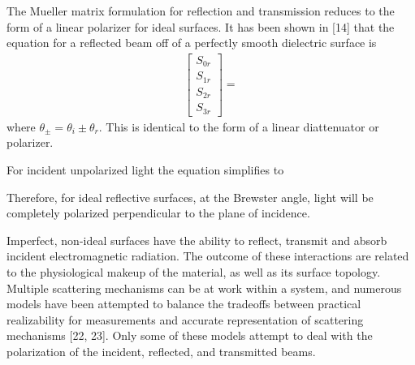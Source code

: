 
The Mueller matrix formulation for reflection and transmission reduces to the form of a linear polarizer for ideal surfaces.  It has been shown in [14] that the equation for a reflected beam off of a perfectly smooth dielectric surface is
%
\begin{align}
    \begin{bmatrix}
        S_{0r} \\
        S_{1r} \\
        S_{2r} \\
        S_{3r}
    \end{bmatrix}
    =
\end{align}
%
where $\theta_{\pm}=\theta_i \pm \theta_r$. This is identical to the form of a linear diattenuator or polarizer.

For incident unpolarized light the equation simplifies to
%

%
Therefore, for ideal reflective surfaces, at the Brewster angle, light will be completely polarized perpendicular to the plane of incidence.

Imperfect, non-ideal surfaces have the ability to reflect, transmit and absorb incident electromagnetic radiation.  The outcome of these interactions are related to the physiological makeup of the material, as well as its surface topology.  Multiple scattering mechanisms can be at work within a system, and numerous models have been attempted to balance the tradeoffs between practical realizability for measurements and accurate representation of scattering mechanisms [22, 23].  Only some of these models attempt to deal with the polarization of the incident, reflected, and transmitted beams.
